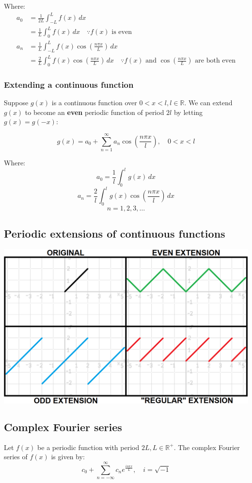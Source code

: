 \documentclass[11pt]{article}
\begin{document}
Where:
\begin{align*}
a_0 &= \frac{1}{2L} \int_{-L}^{L} f(x) \, dx \\
&= \frac{1}{L} \int_0^L f(x) \, dx \quad \because f(x) \text{ is even} \\
a_n &= \frac{1}{L} \int_{-L}^{L} f(x) \cos \left( \frac{n \pi x}{L} \right) \, dx \\
&= \frac{2}{L} \int_0^L f(x) \cos \left( \frac{n \pi x}{L} \right) \, dx \quad \because f(x) \text{ and } \cos \left( \frac{n \pi x}{L} \right) \text{ are both even}
\end{align*}
\subsubsection{Extending a continuous function}
\label{sec:org56516df}
Suppose \(g(x)\) is a continuous function over \(0 < x < l, l \in \mathbb{R}\). We can extend \(g(x)\) to become an \textbf{even} periodic function of period \(2l\) by letting \(g(x) = g(-x)\):

\[g(x) = a_0 + \sum_{n = 1}^{\infty} a_n \cos \left( \frac{n \pi x}{l} \right), \quad 0 < x < l\]

Where:
\[a_0 = \frac{1}{l} \int_0^l g(x) \, dx\]
\[a_n = \frac{2}{l} \int_0^l g(x) \cos \left( \frac{n \pi x}{l} \right) \, dx\]
\[n = 1, 2, 3, \ldots\]

 \newpage
\subsection{Periodic extensions of continuous functions}
\label{sec:orgf1ff45e}
\begin{center}
\includegraphics[width=.9\linewidth]{./images/function-extensions.png}
\end{center}
\subsection{Complex Fourier series}
\label{sec:orgddefe22}
Let \(f(x)\) be a periodic function with period \(2L, L \in \mathbb{R}^{+}\). The complex Fourier series of \(f(x)\) is given by:
\[c_0 + \sum_{n = - \infty}^{\infty} c_n e^{\frac{i n \pi x}{L}}, \quad i = \sqrt{-1}\]
\end{document}
